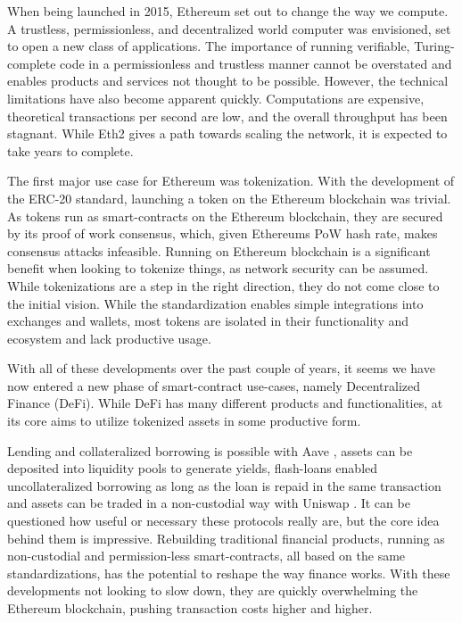 \documentclass[../thesis.tex]{subfiles}
\begin{document}
When being launched in 2015, Ethereum \cite{wood2014ethereum} set out to change the way we compute. A trustless, permissionless, and decentralized world computer was envisioned, set to open a new class of applications. The importance of running verifiable, Turing-complete code in a permissionless and trustless manner cannot be overstated and enables products and services not thought to be possible. However, the technical limitations have also become apparent quickly. Computations are expensive, theoretical transactions per second are low, and the overall throughput has been stagnant. While Eth2 gives a path towards scaling the network, it is expected to take years to complete. 

The first major use case for Ethereum was tokenization. With the development of the ERC-20 standard, launching a token on the Ethereum blockchain was trivial. As tokens run as smart-contracts on the Ethereum blockchain, they are secured by its proof of work consensus, which, given Ethereums PoW hash rate, makes consensus attacks infeasible. Running on Ethereum blockchain is a significant benefit when looking to tokenize things, as network security can be assumed. While tokenizations are a step in the right direction, they do not come close to the initial vision. While the standardization enables simple integrations into exchanges and wallets, most tokens are isolated in their functionality and ecosystem and lack productive usage.

With all of these developments over the past couple of years, it seems we have now entered a new phase of smart-contract use-cases, namely Decentralized Finance (DeFi). While DeFi has many different products and functionalities, at its core aims to utilize tokenized assets in some productive form. 


Lending and collateralized borrowing is possible with Aave \cite{kulechov_2020}, assets can be deposited into liquidity pools\cite{adams2020uniswap} to generate yields, flash-loans \cite{kulechov_2020}\cite{adams2020uniswap} enabled uncollateralized borrowing as long as the loan is repaid in the same transaction and assets can be traded in a non-custodial way with Uniswap \cite{adams2020uniswap} . It can be questioned how useful or necessary these protocols really are, but the core idea behind them is impressive. Rebuilding traditional financial products, running as non-custodial and permission-less smart-contracts, all based on the same standardizations, has the potential to reshape the way finance works. With these developments not looking to slow down, they are quickly overwhelming the Ethereum blockchain, pushing transaction costs \cite{gasprice} higher and higher. 
\end{document}
